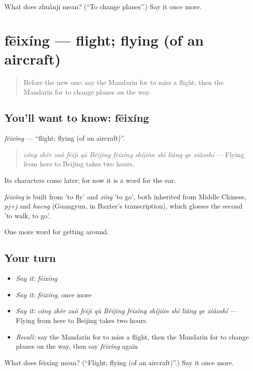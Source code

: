\begin{tcolorbox}[breakable,colback=teal!4,colframe=teal!35!black,title={Before you move on}]
What does zhuǎnjī mean? (\textquotedblleft{}To change planes\textquotedblright{}.) Say it once more.
\end{tcolorbox}
\section[fēixíng]{fēixíng — flight; flying (of an aircraft)}

\label{lesson:ZH-C416-feixing}



\begin{quote}
Before the new one: say the Mandarin for to miss a flight, then the Mandarin for to change planes on the way.
\end{quote}

\subsection*{You'll want to know: fēixíng}
\emph{fēixíng} — \textquotedblleft{}flight; flying (of an aircraft)\textquotedblright{}.

\begin{quote}
\emph{cóng zhèr zuò fēijī qù Běijīng fēixíng shíjiān shì liǎng ge xiǎoshí} — Flying from here to Beijing takes two hours.
\end{quote}

Its characters come later; for now it is a word for the ear.

\begin{cousinweb}
\emph{fēixíng} is built from  'to fly' and \emph{xíng} 'to go', both inherited from Middle Chinese, \emph{pj+j} and \emph{haeng} (Guangyun, in Baxter's transcription), which glosses the second 'to walk, to go'.
\end{cousinweb}

\begin{grammarlens}[title={What you've built}]
One more word for getting around.
\end{grammarlens}

\subsection*{Your turn}
\begin{itemize}
\raggedright
  \item \emph{Say it:} \emph{fēixíng}
  \item \emph{Say it:} \emph{fēixíng}, once more
  \item \emph{Say it:} \emph{cóng zhèr zuò fēijī qù Běijīng fēixíng shíjiān shì liǎng ge xiǎoshí} — Flying from here to Beijing takes two hours.
  \item \emph{Recall:} say the Mandarin for to miss a flight, then the Mandarin for to change planes on the way, then say \emph{fēixíng} again
\end{itemize}

\begin{tcolorbox}[breakable,colback=teal!4,colframe=teal!35!black,title={Before you move on}]
What does fēixíng mean? (\textquotedblleft{}Flight; flying (of an aircraft)\textquotedblright{}.) Say it once more.
\end{tcolorbox}
